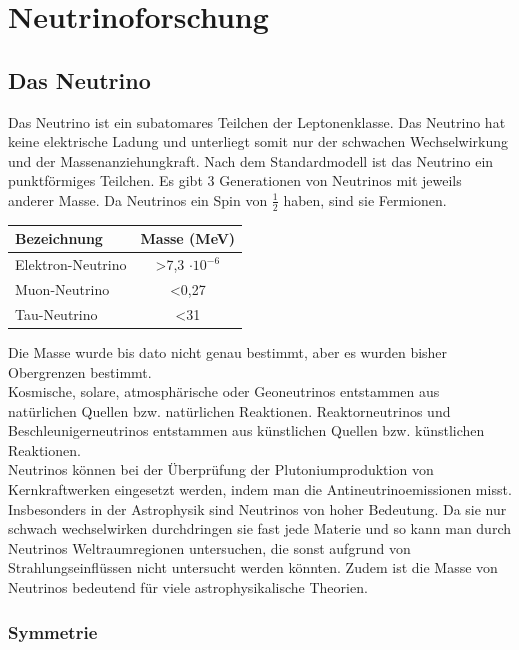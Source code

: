 \chapter{Neutrinoforschung}
\vspace{8pt}

\section{Das Neutrino}
Das Neutrino ist ein subatomares Teilchen der Leptonenklasse. Das Neutrino hat keine
elektrische Ladung und unterliegt somit nur der schwachen Wechselwirkung und der
Massenanziehungkraft. Nach dem Standardmodell ist das Neutrino ein punktförmiges Teilchen.
Es gibt 3 Generationen von Neutrinos mit jeweils anderer Masse.
Da Neutrinos ein Spin von $\frac{1}{2}$ haben, sind sie Fermionen. \\ \cite{Stoecker2000}
\begin{center}
    \begin{tabular}{ | l | c | } \hline
        Bezeichnung & Masse (MeV) \\ \hline
        Elektron-Neutrino & >7,3 $\cdot 10^{-6}$\\
        Muon-Neutrino & <0,27  \\
        Tau-Neutrino & <31 \\ \hline
    \end{tabular}
\end{center}
Die Masse wurde bis dato nicht genau bestimmt,
aber es wurden bisher Obergrenzen bestimmt.\\
Kosmische, solare, atmosphärische oder Geoneutrinos entstammen aus natürlichen Quellen bzw.
natürlichen Reaktionen.
Reaktorneutrinos und Beschleunigerneutrinos entstammen aus künstlichen Quellen bzw. künstlichen
Reaktionen. \\
Neutrinos können bei der Überprüfung der Plutoniumproduktion von Kernkraftwerken eingesetzt
werden, indem man die Antineutrinoemissionen misst. \cite{Krauter2006} \\
Insbesonders in der Astrophysik sind Neutrinos von hoher Bedeutung.
Da sie nur schwach wechselwirken durchdringen sie fast jede Materie und so kann man durch
Neutrinos Weltraumregionen untersuchen, die sonst aufgrund von Strahlungseinflüssen
nicht untersucht werden könnten.
Zudem ist die Masse von Neutrinos bedeutend für viele astrophysikalische Theorien. 

\subsection{Symmetrie}

